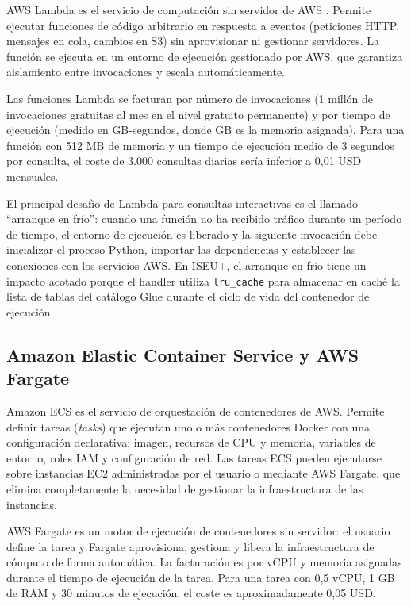 AWS Lambda es el servicio de computación sin servidor de AWS \parencite{AWS2023Lambda}. Permite ejecutar funciones de código arbitrario en respuesta a eventos (peticiones HTTP, mensajes en cola, cambios en S3) sin aprovisionar ni gestionar servidores. La función se ejecuta en un entorno de ejecución gestionado por AWS, que garantiza aislamiento entre invocaciones y escala automáticamente.

Las funciones Lambda se facturan por número de invocaciones (1 millón de invocaciones gratuitas al mes en el nivel gratuito permanente) y por tiempo de ejecución (medido en GB-segundos, donde GB es la memoria asignada). Para una función con 512 MB de memoria y un tiempo de ejecución medio de 3 segundos por consulta, el coste de 3.000 consultas diarias sería inferior a 0{,}01 USD mensuales.

El principal desafío de Lambda para consultas interactivas es el llamado ``arranque en frío'': cuando una función no ha recibido tráfico durante un período de tiempo, el entorno de ejecución es liberado y la siguiente invocación debe inicializar el proceso Python, importar las dependencias y establecer las conexiones con los servicios AWS. En ISEU+, el arranque en frío tiene un impacto acotado porque el handler utiliza \texttt{lru\_cache} para almacenar en caché la lista de tablas del catálogo Glue durante el ciclo de vida del contenedor de ejecución.

\subsection{Amazon Elastic Container Service y AWS Fargate}

Amazon ECS \parencite{AWS2023ECS} es el servicio de orquestación de contenedores de AWS. Permite definir tareas (\textit{tasks}) que ejecutan uno o más contenedores Docker con una configuración declarativa: imagen, recursos de CPU y memoria, variables de entorno, roles IAM y configuración de red. Las tareas ECS pueden ejecutarse sobre instancias EC2 administradas por el usuario o mediante AWS Fargate, que elimina completamente la necesidad de gestionar la infraestructura de las instancias.

AWS Fargate \parencite{AWS2023Fargate} es un motor de ejecución de contenedores sin servidor: el usuario define la tarea y Fargate aprovisiona, gestiona y libera la infraestructura de cómputo de forma automática. La facturación es por vCPU y memoria asignadas durante el tiempo de ejecución de la tarea. Para una tarea con 0{,}5 vCPU, 1 GB de RAM y 30 minutos de ejecución, el coste es aproximadamente 0{,}05 USD.

